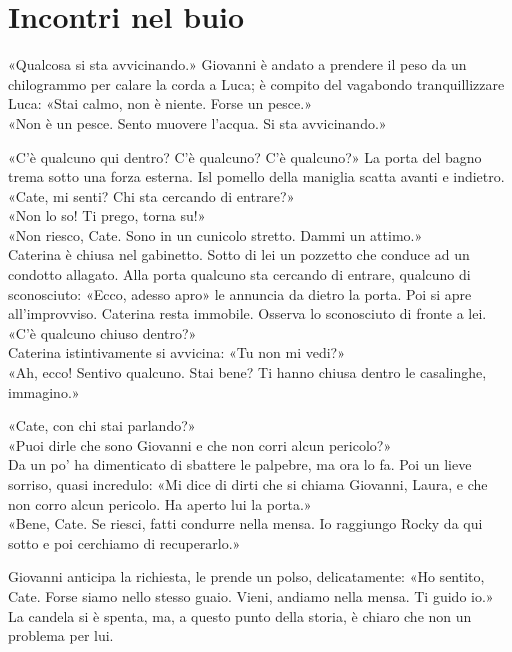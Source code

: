\chapter{Incontri nel buio}

«Qualcosa si sta avvicinando.» Giovanni \`e andato a prendere il peso da un chilogrammo per calare la corda a Luca; \`e compito del vagabondo tranquillizzare Luca:
«Stai calmo, non \`e niente. Forse un pesce.»\\
«Non \`e un pesce. Sento muovere l’acqua. Si sta avvicinando.»

\separatore
\par\medskip

«C’\`e qualcuno qui dentro? C’\`e qualcuno? C’\`e qualcuno?»
La porta del bagno trema sotto una forza esterna. Isl pomello della maniglia scatta avanti e indietro.\\
«Cate, mi senti? Chi sta cercando di entrare?»\\
«Non lo so! Ti prego, torna su!»\\
«Non riesco, Cate. Sono in un cunicolo stretto. Dammi un attimo.»\\
Caterina \`e chiusa nel gabinetto. Sotto di lei un pozzetto che conduce ad un condotto allagato. Alla porta qualcuno sta cercando di entrare, qualcuno di sconosciuto:
«Ecco, adesso apro» le annuncia da dietro la porta.
Poi si apre all’improvviso. Caterina resta immobile.
Osserva lo sconosciuto di fronte a lei.\\
«C’\`e qualcuno chiuso dentro?»\\
Caterina istintivamente si avvicina: «Tu non mi vedi?»\\
«Ah, ecco! Sentivo qualcuno. Stai bene? Ti hanno chiusa dentro le casalinghe, immagino.»

\par\medskip
«Cate, con chi stai parlando?»\\
«Puoi dirle che sono Giovanni e che non corri alcun pericolo?»\\
Da un po' ha dimenticato di sbattere le palpebre, ma ora lo fa. Poi un lieve sorriso, quasi incredulo:
«Mi dice di dirti che si chiama Giovanni, Laura, e che non corro alcun pericolo. Ha aperto lui la porta.»\\
«Bene, Cate. Se riesci, fatti condurre nella mensa. Io raggiungo Rocky da qui sotto e poi cerchiamo di recuperarlo.»

\par\medskip
Giovanni anticipa la richiesta, le prende un polso, delicatamente:
«Ho sentito, Cate. Forse siamo nello stesso guaio. Vieni, andiamo nella mensa. Ti guido io.»\\
La candela si \`e spenta, ma,  a questo punto della storia,  \`e chiaro che non un problema per lui.

